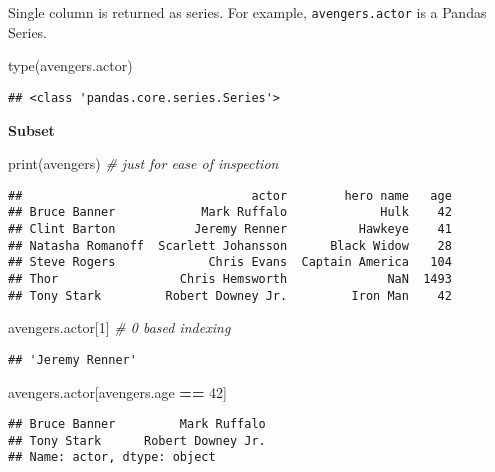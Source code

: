 \documentclass[
]{book}
\newenvironment{Shaded}{\begin{snugshade}}{\end{snugshade}}
\newcommand{\BuiltInTok}[1]{#1}
\newcommand{\CommentTok}[1]{\textcolor[rgb]{0.56,0.35,0.01}{\textit{#1}}}
\newcommand{\DecValTok}[1]{\textcolor[rgb]{0.00,0.00,0.81}{#1}}
\newcommand{\NormalTok}[1]{#1}
\newcommand{\OperatorTok}[1]{\textcolor[rgb]{0.81,0.36,0.00}{\textbf{#1}}}
\begin{document}
Single column is returned as series. For example, \texttt{avengers.actor} is a Pandas Series.

\begin{Shaded}
\begin{Highlighting}[]
\BuiltInTok{type}\NormalTok{(avengers.actor)}
\end{Highlighting}
\end{Shaded}

\begin{verbatim}
## <class 'pandas.core.series.Series'>
\end{verbatim}

\textbf{Subset}

\begin{Shaded}
\begin{Highlighting}[]
\BuiltInTok{print}\NormalTok{(avengers) }\CommentTok{\# just for ease of inspection}
\end{Highlighting}
\end{Shaded}

\begin{verbatim}
##                                actor        hero name   age
## Bruce Banner            Mark Ruffalo             Hulk    42
## Clint Barton           Jeremy Renner          Hawkeye    41
## Natasha Romanoff  Scarlett Johansson      Black Widow    28
## Steve Rogers             Chris Evans  Captain America   104
## Thor                 Chris Hemsworth              NaN  1493
## Tony Stark         Robert Downey Jr.         Iron Man    42
\end{verbatim}

\begin{Shaded}
\begin{Highlighting}[]
\NormalTok{avengers.actor[}\DecValTok{1}\NormalTok{] }\CommentTok{\# 0 based indexing}
\end{Highlighting}
\end{Shaded}

\begin{verbatim}
## 'Jeremy Renner'
\end{verbatim}

\begin{Shaded}
\begin{Highlighting}[]
\NormalTok{avengers.actor[avengers.age }\OperatorTok{==} \DecValTok{42}\NormalTok{]}
\end{Highlighting}
\end{Shaded}

\begin{verbatim}
## Bruce Banner         Mark Ruffalo
## Tony Stark      Robert Downey Jr.
## Name: actor, dtype: object
\end{verbatim}
\end{document}
